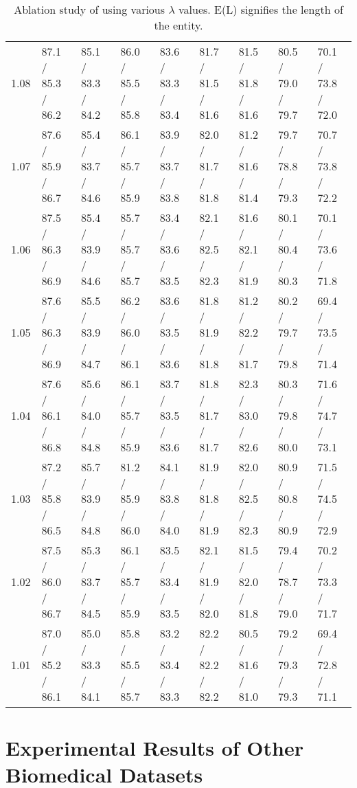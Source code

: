 \documentclass[11pt]{article}
\begin{document}
\begin{table*}[t]
\begin{adjustbox}{width=\textwidth}
\begin{tabular}{ c l l l l l l l l }
1.08 & 87.1 / 85.3 / 86.2 & 85.1 / 83.3 / 84.2 & 86.0 / 85.5 / 85.8 & 83.6 / 83.3 / 83.4 & 81.7 / 81.5 / 81.6 & 81.5 / 81.8 / 81.6 & 80.5 / 79.0 / 79.7 & 70.1 / 73.8 / 72.0 \\ 
1.07 & 87.6 / 85.9 / 86.7 & 85.4 / 83.7 / 84.6 & 86.1 / 85.7 / 85.9 & 83.9 / 83.7 / 83.8 & 82.0 / 81.7 / 81.8 & 81.2 / 81.6 / 81.4 & 79.7 / 78.8 / 79.3 & 70.7 / 73.8 / 72.2 \\ 
1.06                                         & 87.5 / 86.3 / 86.9 & 85.4 / 83.9 / 84.6 & 85.7 / 85.7 / 85.7 & 83.4 / 83.6 / 83.5 & 82.1 / 82.5 / 82.3 & 81.6 / 82.1 / 81.9 & 80.1 / 80.4 / 80.3 & 70.1 / 73.6 / 71.8 \\ 
1.05                                         & 87.6 / 86.3 / 86.9 & 85.5 / 83.9 / 84.7 & 86.2 / 86.0 / 86.1 & 83.6 / 83.5 / 83.6 & 81.8 / 81.9 / 81.8 & 81.2 / 82.2 / 81.7 & 80.2 / 79.7 / 79.8 & 69.4 / 73.5 / 71.4 \\ 
1.04                                         & 87.6 / 86.1 / 86.8 & 85.6 / 84.0 / 84.8 & 86.1 / 85.7 / 85.9 & 83.7 / 83.5 / 83.6 & 81.8 / 81.7 / 81.7 & 82.3 / 83.0 / 82.6 & 80.3 / 79.8 / 80.0 & 71.6 / 74.7 / 73.1 \\ 
1.03                                         & 87.2 / 85.8 / 86.5 & 85.7 / 83.9 / 84.8 & 81.2 / 85.9 / 86.0 & 84.1 / 83.8 / 84.0 & 81.9 / 81.8 / 81.9 & 82.0 / 82.5 / 82.3 & 80.9 / 80.8 / 80.9 & 71.5 / 74.5 / 72.9 \\ 
1.02                                         & 87.5 / 86.0 / 86.7 & 85.3 / 83.7 / 84.5 & 86.1 / 85.7 / 85.9 & 83.5 / 83.4 / 83.5 & 82.1 / 81.9 / 82.0 & 81.5 / 82.0 / 81.8 & 79.4 / 78.7 / 79.0 & 70.2 / 73.3 / 71.7 \\ 
1.01                                         & 87.0 / 85.2 / 86.1 & 85.0 / 83.3 / 84.1 & 85.8 / 85.5 / 85.7 & 83.2 / 83.4 / 83.3 & 82.2 / 82.2 / 82.2 & 80.5 / 81.6 / 81.0 & 79.2 / 79.3 / 79.3 & 69.4 / 72.8 / 71.1 \\ \bottomrule
\end{tabular}
\end{adjustbox}
\caption{Ablation study of using various $\lambda$ values. E(L) signifies the length of the entity.}
\label{tab:app length ablation}
\end{table*}

\section{Experimental Results of Other Biomedical Datasets}
\label{app:experimental results}
\end{document}
